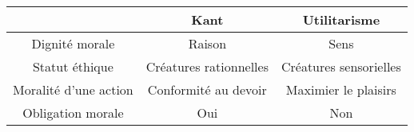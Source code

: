 \documentclass[11pt]{article}
\begin{document}
\begin{center}
\begin{tabulary}{\textwidth}{@{}CCC@{}}
\hline
& \textbf{Kant}
& \textbf{Utilitarisme}\\
\hline
  Dignité morale
& Raison
& Sens\\
  Statut éthique
& Créatures rationnelles 
& Créatures sensorielles\\
  Moralité d'une action
& Conformité au devoir
& Maximier le plaisirs\\
  Obligation morale
& Oui
& Non\\
\hline
\end{tabulary}
\end{center}
\end{document}
